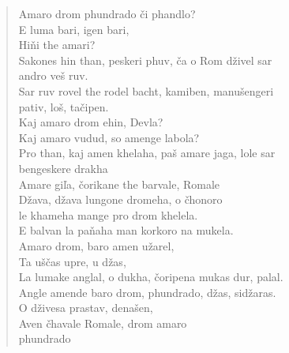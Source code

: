 \begin{verse}
Amaro drom phundrado či phandlo? \\
E luma bari, igen bari,  \\
Hiňi the amari? \\
Sakones hin than, peskeri phuv, ča o Rom dživel sar  \\
\hspace{\fill}andro veš  ruv. \\
Sar ruv rovel the rodel  bacht, kamiben, manušengeri  \\
\hspace{\fill}pativ, loš, tačipen. \\
Kaj amaro drom ehin, Devla? \\
Kaj amaro vudud, so amenge labola? \\
Pro than, kaj amen khelaha, paš amare jaga, lole sar  \\
\hspace{\fill}bengeskere drakha \\ 
Amare giľa, čorikane the barvale, Romale \\
Džava, džava lungone dromeha, o čhonoro  \\
\hspace{\fill}le khameha mange pro drom khelela. \\
E balvan la paňaha man korkoro na mukela. \\
Amaro drom, baro amen užarel, \\
Ta uščas upre, u džas, \\
La lumake anglal, o dukha, čoripena mukas dur, palal. \\
Angle amende baro drom, phundrado, džas, sidžaras. \\
O dživesa prastav, denašen, \\
Aven čhavale Romale, drom amaro \\ 
 phundrado
\end{verse}
